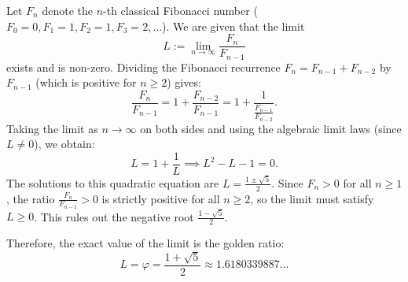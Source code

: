 \begin{exercisesolution*}
\label{sol:golden_ratio_part2}
Let $F_n$ denote the $n$-th classical Fibonacci number ($F_0 = 0, F_1 = 1, F_2 = 1, F_3 = 2, \dots$). We are given that the limit
\[
L := \lim_{n \to \infty} \frac{F_n}{F_{n-1}}
\]
exists and is non-zero. Dividing the Fibonacci recurrence $F_n = F_{n-1} + F_{n-2}$ by $F_{n-1}$ (which is positive for $n \ge 2$) gives:
\[
\frac{F_n}{F_{n-1}} = 1 + \frac{F_{n-2}}{F_{n-1}} = 1 + \frac{1}{\frac{F_{n-1}}{F_{n-2}}}.
\]
Taking the limit as $n \to \infty$ on both sides and using the algebraic limit laws (since $L \ne 0$), we obtain:
\[
L = 1 + \frac{1}{L} \implies L^2 - L - 1 = 0.
\]
The solutions to this quadratic equation are $L = \frac{1 \pm \sqrt{5}}{2}$. Since $F_n > 0$ for all $n \ge 1$, the ratio $\frac{F_n}{F_{n-1}} > 0$ is strictly positive for all $n \ge 2$, so the limit must satisfy $L \ge 0$. This rules out the negative root $\frac{1-\sqrt{5}}{2}$.

Therefore, the exact value of the limit is the golden ratio:
\[
L = \varphi = \frac{1 + \sqrt{5}}{2} \approx 1.6180339887\dots
\]
\end{exercisesolution*}
